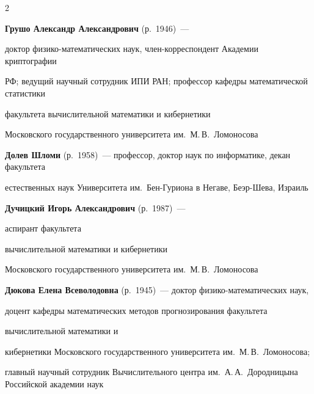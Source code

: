\begin{multicols}{2}
\noindent 

\textbf{Грушо Александр Александрович} (р.\ 1946)~---

доктор фи\-зи\-ко-ма\-те\-ма\-ти\-че\-ских наук,  член-корреспондент Академии криптографии

РФ; ведущий научный сотрудник ИПИ РАН; профессор кафедры математической статистики

факультета вычислительной математики и кибернетики 

Московского государственного университета им.\ М.\,В.~Ломоносова



\vspace*{4pt}



\noindent

\textbf{Долев Шломи} (р.\ 1958)~--- профессор, доктор наук по информатике, декан факультета

естественных наук Университета им.\ Бен-Гуриона в Негаве, Беэр-Шева, Израиль





\vspace*{4pt}





\noindent 

\textbf{Дучицкий Игорь Александрович} (р.\ 1987)~---

аспирант факультета

вычислительной математики и кибернетики 

Московского государственного университета им.\ М.\,В.~Ломоносова



\vspace*{4pt}







\noindent

\textbf{Дюкова Елена Всеволодовна} (р.\ 1945)~--- доктор фи\-зи\-ко-математических наук,

доцент кафедры математических методов прогнозирования факультета

вычислительной математики и 

кибернетики Московского государственного университета им.\ М.\,В.~Ломоносова;

главный научный сотрудник Вычислительного центра им.\ А.\,А.~Дородницына Российской академии наук




\end{multicols}
